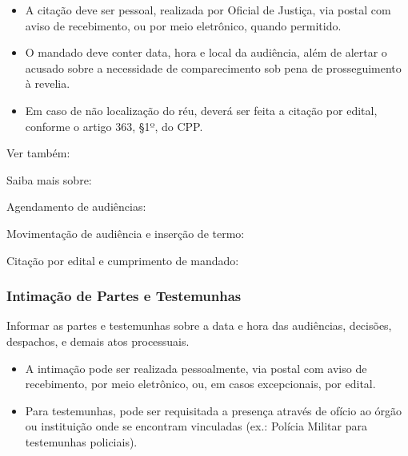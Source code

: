 \documentclass[letterpaper,10pt,brazil]{sphinxmanual}
\begin{document}
\sphinxAtStartPar
{}
\begin{itemize}
\item {} 
\sphinxAtStartPar
A citação deve ser pessoal, realizada por Oficial de Justiça, via postal com aviso de recebimento, ou por meio eletrônico, quando permitido.

\item {} 
\sphinxAtStartPar
O mandado deve conter data, hora e local da audiência, além de alertar o acusado sobre a necessidade de comparecimento sob pena de prosseguimento à revelia.

\item {} 
\sphinxAtStartPar
Em caso de não localização do réu, deverá ser feita a citação por edital, conforme o artigo 363, \S{}1º, do CPP.

\end{itemize}


\begin{sphinxseealso}{Ver também:}

\sphinxAtStartPar
Saiba mais sobre:

\sphinxAtStartPar
Agendamento de audiências: {\hyperref[\detokenize{projud_46_comopautaraudiencia::doc}]{}}

\sphinxAtStartPar
Movimentação de audiência e inserção de termo: {\hyperref[\detokenize{projud_47_movimentacaoaudiencia::doc}]{}}

\sphinxAtStartPar
Citação por edital e cumprimento de mandado: {\hyperref[\detokenize{projud_33_ordenarcumprimento::doc}]{}}


\end{sphinxseealso}



\subsubsection{Intimação de Partes e Testemunhas}
\label{\detokenize{06atosintimatorios:intimacao-de-partes-e-testemunhas}}
\sphinxAtStartPar
{}

\sphinxAtStartPar
Informar as partes e testemunhas sobre a data e hora das audiências, decisões, despachos, e demais atos processuais.

\sphinxAtStartPar
{}
\begin{itemize}
\item {} 
\sphinxAtStartPar
A intimação pode ser realizada pessoalmente, via postal com aviso de recebimento, por meio eletrônico, ou, em casos excepcionais, por edital.

\item {} 
\sphinxAtStartPar
Para testemunhas, pode ser requisitada a presença através de ofício ao órgão ou instituição onde se encontram vinculadas (ex.: Polícia Militar para testemunhas policiais).

\end{itemize}
\end{document}
